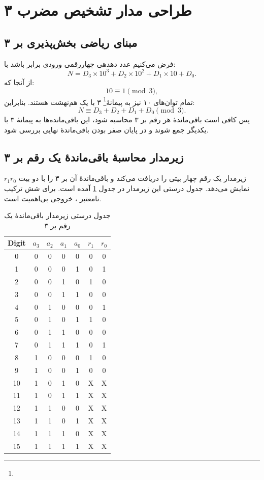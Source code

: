 \documentclass[11pt,a4paper]{article}
\newcommand{\enfoot}[1]{\footnote{\lr{#1}}}
\newcommand{\filename}[1]{\lr{\texttt{#1}}}
\begin{document}
\section{طراحی مدار تشخیص مضرب ۳}

\subsection{مبنای ریاضی بخش‌پذیری بر ۳}
فرض می‌کنیم عدد دهدهی چهاررقمی ورودی برابر باشد با:
\[
N=D_3\times 10^3+D_2\times 10^2+D_1\times 10+D_0.
\]
از آنجا که:
\[
10\equiv 1\pmod 3,
\]
تمام توان‌های ۱۰ نیز به پیمانهٔ\enfoot{Modulo} ۳ با یک هم‌نهشت هستند. بنابراین:
\[
N\equiv D_3+D_2+D_1+D_0\pmod 3.
\]
پس کافی است باقی‌ماندهٔ هر رقم بر ۳ محاسبه شود، این باقی‌مانده‌ها به پیمانهٔ ۳ با یکدیگر جمع شوند و در پایان صفر بودن باقی‌ماندهٔ نهایی بررسی شود.

\subsection{زیرمدار محاسبهٔ باقی‌ماندهٔ یک رقم بر ۳}
زیرمدار \filename{modulo3.bdf} یک رقم  چهار بیتی را دریافت می‌کند و باقی‌ماندهٔ آن بر ۳ را با دو بیت \(r_1r_0\) نمایش می‌دهد. جدول درستی این زیرمدار در جدول \ref{tab:mod3-truth} آمده است. برای شش ترکیب نامعتبر ، خروجی بی‌اهمیت است.

\begin{table}[H]
  \centering
  \begin{latin}
  \renewcommand{\arraystretch}{1.15}
  \begin{tabular}{ccccc|cc}
    \toprule
    Digit & $a_3$ & $a_2$ & $a_1$ & $a_0$ & $r_1$ & $r_0$ \\
    \midrule
    0  & 0&0&0&0&0&0 \\
    1  & 0&0&0&1&0&1 \\
    2  & 0&0&1&0&1&0 \\
    3  & 0&0&1&1&0&0 \\
    4  & 0&1&0&0&0&1 \\
    5  & 0&1&0&1&1&0 \\
    6  & 0&1&1&0&0&0 \\
    7  & 0&1&1&1&0&1 \\
    8  & 1&0&0&0&1&0 \\
    9  & 1&0&0&1&0&0 \\
    10 & 1&0&1&0&X&X \\
    11 & 1&0&1&1&X&X \\
    12 & 1&1&0&0&X&X \\
    13 & 1&1&0&1&X&X \\
    14 & 1&1&1&0&X&X \\
    15 & 1&1&1&1&X&X \\
    \bottomrule
  \end{tabular}
  \end{latin}
  \caption{جدول درستی زیرمدار باقی‌ماندهٔ یک رقم بر ۳}
  \label{tab:mod3-truth}
\end{table}
\end{document}
